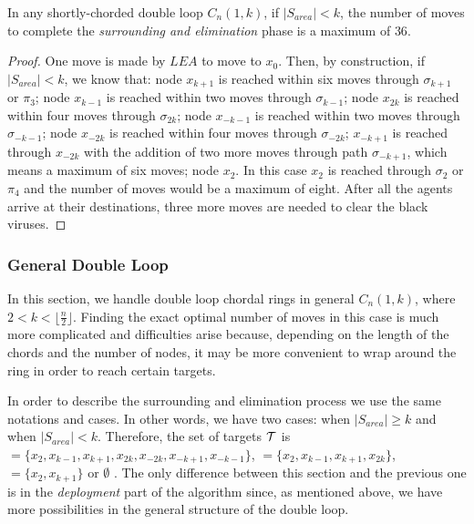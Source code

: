 \begin{theorem} 
In any shortly-chorded  double loop   $C_n(1,k)$, if $\left\vert{S_{area}}\right\vert < k$,
the number of moves to complete the  {\em surrounding  and elimination} phase is a maximum of $36$.
\end{theorem}

 \begin{proof}
One move is made by $LEA$ to move to $x_0$. Then, by construction,  if  $\left\vert{S_{area}}\right\vert < k$, we know that: node  $x_{k+1}$ is reached within six moves through $\sigma_{k+1}$ or $\pi_3$; 
node  $x_{k-1}$ is reached within two moves through $\sigma_{k-1}$;
node  $x_{2k}$ is reached within four moves through $\sigma_{2k}$;
node   $x_{-k-1}$ is reached within two moves through $\sigma_{-k-1}$;
node    $x_{-2k}$ is reached within four moves through $\sigma_{-2k}$;
  $x_{-k+1}$ is  reached through $x_{-2k}$ with the addition of two more moves through path $\sigma_{-k+1}$, which means a maximum of six moves;
node $x_{2}$. In this case $x_2$ is reached through $\sigma_{2}$ or $\pi_4$ and the number of moves would be a maximum of eight. After all the agents arrive at their destinations, three more moves are needed to clear the black viruses. 

\end{proof}


\subsubsection{General Double Loop}
\label{sec:general}


In this section, we handle double loop chordal rings in general $C_n(1,k)$, where  $2 < k  < \lfloor\frac{n}{2}\rfloor$. 
Finding the exact optimal number of moves in this  case is much more complicated and difficulties arise because, depending on the length of the chords and the number of nodes,  it may be more convenient to wrap around the ring in order to reach certain targets.

In order to describe the surrounding and elimination process we use the same notations and cases. In other words, we have two cases: when $\left\vert{S_{area}}\right\vert \ge k$ and when $\left\vert{S_{area}}\right\vert < k$. Therefore, the set of targets ${\cal T}$ is  $=\{x_{2},x_{k-1},x_{k+1},x_{2k},x_{-2k},x_{-k+1},x_{-k-1}\}$,  $=\{x_{2},x_{k-1},x_{k+1},x_{2k}\}$, $=\{x_{2},x_{k+1}\}$ or $\emptyset$ . The only difference between this section and the previous one is in the {\it deployment} part of the algorithm since, as mentioned above, we have more possibilities in the general structure of the double loop. 


